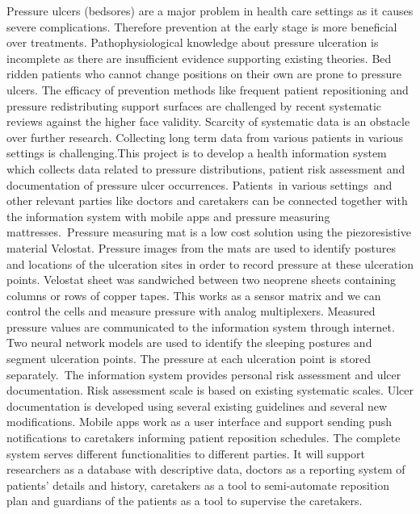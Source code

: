 Pressure ulcers (bedsores) are a major problem in health care settings as it causes severe complications. Therefore prevention at the early stage is more beneficial over treatments. Pathophysiological knowledge about pressure ulceration is incomplete as there are insufficient evidence supporting existing theories. Bed ridden patients who cannot change positions on their own are prone to pressure ulcers. The efficacy of prevention methods like frequent patient repositioning and pressure redistributing support surfaces are challenged by recent systematic reviews against the higher face validity. Scarcity of systematic data is an obstacle over further research. Collecting long term data from various patients in various settings is challenging.This project is to develop a health information system which collects data related to pressure distributions, patient risk assessment and documentation of pressure ulcer occurrences. Patients in various settings and other relevant parties like doctors and caretakers can be connected together with the information system with mobile apps and pressure measuring mattresses. Pressure measuring mat is a low cost solution using the piezoresistive material Velostat. Pressure images from the mats are used to identify postures and locations of the ulceration sites in order to record pressure at these ulceration points. Velostat sheet was sandwiched between two neoprene sheets containing columns or rows of copper tapes. This works as a sensor matrix and we can control the cells and measure pressure with analog multiplexers. Measured pressure values are communicated to the information system through internet. Two neural network models are used to identify the sleeping postures and segment ulceration points. The pressure at each ulceration point is stored separately. The information system provides personal risk assessment and ulcer documentation. Risk assessment scale is based on existing systematic scales. Ulcer documentation is developed using several existing guidelines and several new modifications. Mobile apps work as a user interface and support sending push notifications to caretakers informing patient reposition schedules. The complete system serves different functionalities to different parties. It will support researchers as a database with descriptive data, doctors as a reporting system of patients' details and history, caretakers as a tool to semi-automate reposition plan and guardians of the patients as a tool to supervise the caretakers. 